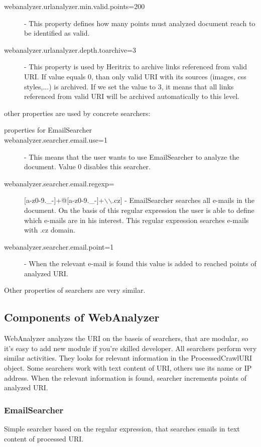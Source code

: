 \documentclass[11pt,a4paper]{article}
\begin{document}
\begin{description}
\item[webanalyzer.urlanalyzer.min.valid.points=200] - This property defines how many points must analyzed document reach to be identified as valid.
\item[webanalyzer.urlanalyzer.depth.toarchive=3] - This property is used by Heritrix to archive links referenced from valid URI. If value equals 0, than only valid URI with its sources (images, css styles,...) is archived. If we set the value to 3, it means that all links referenced from valid URI will be archived automatically to this level.
\end{description} 

other properties are used by concrete searchers:
\begin{description}
\item[properties for EmailSearcher]
\item[webanalyzer.searcher.email.use=1] - This means that the user wants to use EmailSearcher to analyze the document. Value 0 disables this searcher.
\item[webanalyzer.searcher.email.regexp=][a-z0-9.\_-]+@[a-z0-9.\_-]+$\backslash$$\backslash$.cz] - EmailSearcher searches all e-mails in the document. On the basis of this regular expression the user is able to define which e-mails are in his interest. This regular expression searches e-mails with .cz domain.
\item[webanalyzer.searcher.email.point=1] - When the relevant e-mail is found this value is added to reached points of analyzed URI.
\end{description}

Other properties of searchers are very similar.

\subsection{Components of WebAnalyzer}
WebAnalyzer analyzes the URI on the baseis of searchers, that are modular, so it's easy to add new module if you're skilled developer. All searchers perform very similar activities. They looks for relevant information in the ProcessedCrawlURI object. Some searchers work with text content of URI, others use its name or IP address. When the relevant information is found, searcher increments points of analyzed URI.

\subsubsection*{EmailSearcher}
Simple searcher based on the regular expression, that searches emails in text content of processed URI.
\end{document}
